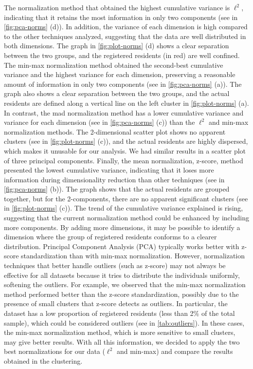 The normalization method that obtained the highest cumulative variance is $\ell^2$, indicating that it retains the most information in only two components (see in \cref{fig:pca-norms} (d)). In addition, the variance of each dimension is high compared to the other techniques analyzed, suggesting that the data are well distributed in both dimensions. The graph in \cref{fig:plot-norms} (d) shows a clear separation between the two groups, and the registered residents (in red) are well confined. The min-max normalization method obtained the second-best cumulative variance and the highest variance for each dimension, preserving a reasonable amount of information in only two components (see in \cref{fig:pca-norms} (a)). The graph also shows a clear separation between the two groups, and the actual residents are defined along a vertical line on the left cluster in \cref{fig:plot-norms} (a). In contrast, the mad normalization method has a lower cumulative variance and variance for each dimension (see in \cref{fig:pca-norms} (c)) than the $\ell^2$ and min-max normalization methods. The 2-dimensional scatter plot shows no apparent clusters (see in \cref{fig:plot-norms} (c)), and the actual residents are highly dispersed, which makes it unusable for our analysis. We had similar results in a scatter plot of three principal components. Finally, the mean normalization, z-score, method presented the lowest cumulative variance, indicating that it loses more information during dimensionality reduction than other techniques (see in \cref{fig:pca-norms} (b)). The graph shows that the actual residents are grouped together, but for the 2-components, there are no apparent significant clusters (see in \cref{fig:plot-norms} (c)). The trend of the cumulative variance explained is rising, suggesting that the current normalization method could be enhanced by including more components. By adding more dimensions, it may be possible to identify a dimension where the group of registered residents conforms to a clearer distribution. Principal Component Analysis (PCA) typically works better with z-score standardization than with min-max normalization. However, normalization techniques that better handle outliers (such as z-score) may not always be effective for all datasets because it tries to distribute the individuals uniformly, softening the outliers. For example, we observed that the min-max normalization method performed better than the z-score standardization, possibly due to the presence of small clusters that z-score detects as outliers. In particular, the dataset has a low proportion of registered residents (less than 2\% of the total sample), which could be considered outliers (see in \cref{tab:outliers}). In these cases, the min-max normalization method, which is more sensitive to small clusters, may give better results. With all this information, we decided to apply the two best normalizations for our data ($\ell^2$ and min-max) and compare the results obtained in the clustering.

